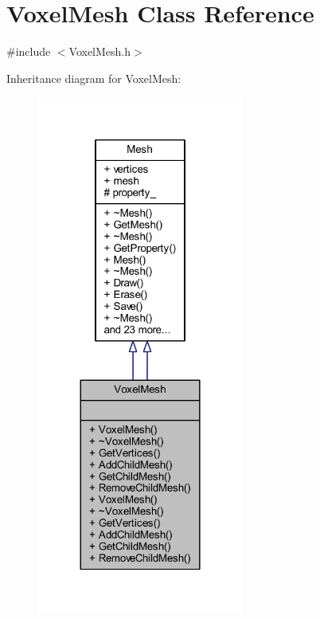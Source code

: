 \hypertarget{class_voxel_mesh}{}\section{Voxel\+Mesh Class Reference}
\label{class_voxel_mesh}


{\ttfamily \#include $<$Voxel\+Mesh.\+h$>$}



Inheritance diagram for Voxel\+Mesh\+:
\nopagebreak
\begin{figure}[H]
\begin{center}
\leavevmode
\includegraphics[width=192pt]{class_voxel_mesh__inherit__graph}
\end{center}
\end{figure}


